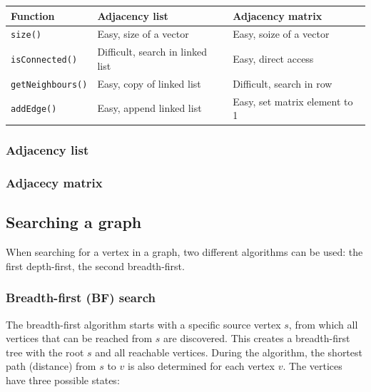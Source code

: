 \begin{table}[H]
    \centering
    \begin{tabular}{p{30mm} | p{50mm} | p{50mm}}
        \toprule
        \textbf{Function} & \textbf{Adjacency list} & \textbf{Adjacency matrix} \\
        \midrule
        \lstinline|size()| & Easy, size of a vector & Easy, soize of a vector \\
        \midrule
        \lstinline|isConnected()| & Difficult, search in linked list & Easy, direct access \\
        \midrule
        \lstinline|getNeighbours()| & Easy, copy of linked list & Difficult, search in row \\
        \midrule
        \lstinline|addEdge()| & Easy, append linked list & Easy, set matrix element to 1 \\
        \bottomrule
    \end{tabular}
\end{table}

\subsubsection{Adjacency list}



\subsubsection{Adjacecy matrix}



\subsection{Searching a graph}

When searching for a vertex in a graph, two different algorithms can be used: the first depth-first, the second breadth-first.

\subsubsection{Breadth-first (BF) search}

The breadth-first algorithm starts with a specific source vertex $s$, from which all vertices that can be reached from $s$ are discovered. This creates a breadth-first tree with the root $s$ and all reachable vertices.  During the algorithm, the shortest path (distance) from $s$ to $v$ is also determined for each vertex $v$. The vertices have three possible states:

